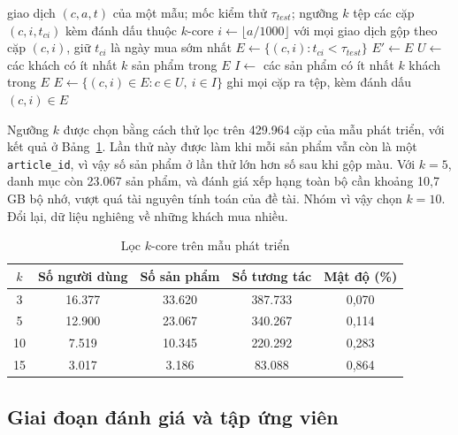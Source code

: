 \begin{algorithm}[H]
\caption{Chuẩn bị dữ liệu và lọc $k$-core}
\label{alg:kcore}
\begin{algorithmic}[1]
\Require giao dịch $(c, a, t)$ của một mẫu; mốc kiểm thử $\tau_{test}$; ngưỡng $k$
\Ensure tệp các cặp $(c, i, t_{ci})$ kèm đánh dấu thuộc $k$-core
\State $i \gets \lfloor a / 1000 \rfloor$ với mọi giao dịch 
\State gộp theo cặp $(c, i)$, giữ $t_{ci}$ là ngày mua sớm nhất
\State $E \gets \{(c, i) : t_{ci} < \tau_{test}\}$ 
\Repeat
    \State $E' \gets E$
    \State $U \gets$ các khách có ít nhất $k$ sản phẩm trong $E$
    \State $I \gets$ các sản phẩm có ít nhất $k$ khách trong $E$
    \State $E \gets \{(c, i) \in E : c \in U,\ i \in I\}$
\State ghi mọi cặp ra tệp, kèm đánh dấu $(c, i) \in E$ 
\end{algorithmic}
\end{algorithm}

\label{subsec:hm_apply}
Ngưỡng $k$ được chọn bằng cách thử lọc trên 429.964 cặp của mẫu phát triển, với kết quả ở Bảng~\ref{tab:kcore_hm}. Lần thử này được làm khi mỗi sản phẩm vẫn còn là một \texttt{article\_id}, vì vậy số sản phẩm ở lần thử lớn hơn số sau khi gộp màu. Với $k = 5$, danh mục còn 23.067 sản phẩm, và đánh giá xếp hạng toàn bộ cần khoảng 10,7 GB bộ nhớ, vượt quá tài nguyên tính toán của đề tài. Nhóm vì vậy chọn $k = 10$. Đổi lại, dữ liệu nghiêng về những khách mua nhiều.

\begin{table}[H]
    \centering\small
    \caption{Lọc $k$-core trên mẫu phát triển}
    \label{tab:kcore_hm}
    \begin{tabular}{|c|c|c|c|c|}
        \hline
        $k$ & Số người dùng & Số sản phẩm & Số tương tác & Mật độ (\%) \\
        \hline
        3 & 16.377 & 33.620 & 387.733 & 0,070 \\ \hline
        5 & 12.900 & 23.067 & 340.267 & 0,114 \\ \hline
        10 & 7.519 & 10.345 & 220.292 & 0,283 \\ \hline
        15 & 3.017 & 3.186 & 83.088 & 0,864 \\
        \hline
    \end{tabular}
\end{table}

\subsection{Giai đoạn đánh giá và tập ứng viên}
\label{subsec:split_sampling}

